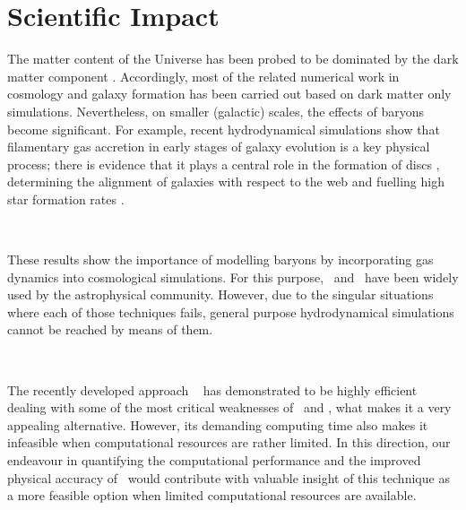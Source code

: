 \documentclass[a4,useAMS,usenatbib,usegraphicx,12pt]{article}
\begin{document}
\section{Scientific Impact}
The matter content of the Universe has been probed to be dominated by the dark 
matter component \citet{Planck13XVI}. Accordingly, most of the related numerical 
work in cosmology and galaxy formation has been carried out based on dark matter 
only simulations. Nevertheless, on smaller (galactic) scales, the effects of 
baryons become significant. For example, recent hydrodynamical simulations show 
that filamentary gas accretion in early stages of galaxy evolution is a key 
physical process; there is evidence that it plays a central role in the formation 
of discs \citet{Dubois14}, determining the alignment of galaxies with respect to 
the web \citet{Hahn10} and fuelling high star formation rates \citet{Dekel09}.

\

These results show the importance of modelling baryons by incorporating gas 
dynamics into cosmological simulations. For this purpose, \AMR\ and \SPH\ have
been widely used by the astrophysical community. However, due to the singular 
situations where each of those techniques fails, general purpose hydrodynamical
simulations cannot be reached by means of them.

\

The recently developed approach \AREPO\ \citet{Springel10} has demonstrated to 
be highly efficient dealing with some of the most critical weaknesses of \AMR\ 
and \SPH, what makes it a very appealing alternative. However, its demanding 
computing time also makes it infeasible when computational resources are rather 
limited. In this direction, our endeavour in quantifying the computational 
performance and the improved physical accuracy of \VPH\ would contribute with 
valuable insight of this technique as a more feasible option when limited 
computational resources are available.


\end{document}
